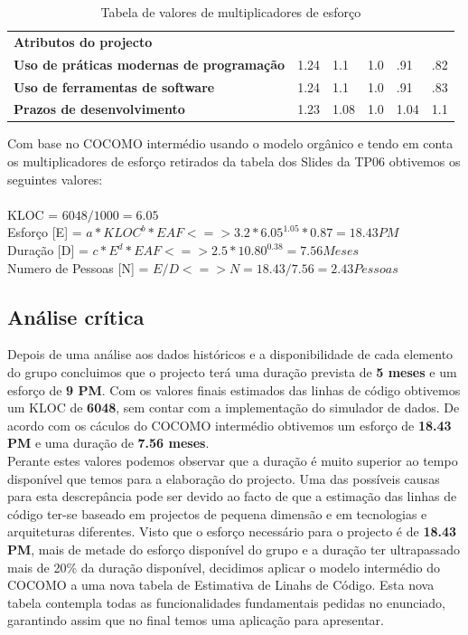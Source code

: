 \documentclass[a4paper]{report}
\begin{document}
\begin{table}[h]
\begin{adjustbox}{width=1\textwidth}
\begin{tabular}{|l|l|l|l|l|l|}
 &  &  &  &  &  \\ \hline
\textbf{Atributos do projecto} &  &  &  &  &  \\ \hline
\textbf{Uso de práticas modernas de programação} & 1.24 & 1.1 & \cellcolor[HTML]{FFFE65}1.0 & .91 & .82 \\ \hline
\textbf{Uso de ferramentas de software} & 1.24 & 1.1 & \cellcolor[HTML]{FFFE65}1.0 & .91 & .83 \\ \hline
\textbf{Prazos de desenvolvimento} & 1.23 & \cellcolor[HTML]{FFFE65}1.08 & 1.0 & 1.04 & 1.1 \\ \hline
\end{tabular}
\end{adjustbox}
\caption{Tabela de valores de multiplicadores de esforço}
\label{my-label}
\end{table}

Com base no COCOMO intermédio usando o modelo orgânico e tendo em conta os multiplicadores de esforço retirados da tabela dos Slides da TP06 \cite{slideTP6} obtivemos os seguintes valores:\\\\ 
KLOC = $6048 / 1000 = 6.05$ \\
Esforço [E] = $a * KLOC^{b} * EAF <=> 3.2 * 6.05^{1.05} * 0.87 = 18.43 PM$\\
Duração [D] = $c * E^{d} * EAF <=> 2.5 * 10.80^{0.38} = 7.56 Meses$\\
Numero de Pessoas [N] = $E / D <=> N = 18.43 / 7.56 = 2.43 Pessoas$

\pagebreak
\subsection{Análise crítica}
\label{AC}

Depois de uma análise aos dados históricos e a disponibilidade de cada elemento do grupo concluimos que o projecto terá uma duração prevista de \textbf{5 meses} e um esforço de \textbf{9 PM}. Com os valores finais estimados das linhas de código obtivemos um KLOC de \textbf{6048}, sem contar com a implementação do simulador de dados. De acordo com os cáculos do COCOMO intermédio obtivemos um esforço de \textbf{18.43 PM} e uma duração de \textbf{7.56 meses}.\\
Perante estes valores podemos observar que a duração é muito superior ao tempo disponível que temos para a elaboração do projecto. Uma das possíveis causas para esta descrepância pode ser devido ao facto de que a estimação das linhas de código ter-se baseado em projectos de pequena dimensão e em tecnologias e arquiteturas diferentes. Visto que o esforço necessário para o projecto é de \textbf{18.43 PM}, mais de metade do esforço disponível do grupo e a duração ter ultrapassado mais de 20\% da duração disponível, decidimos aplicar o modelo intermédio do COCOMO a uma nova tabela de Estimativa de Linahs de Código. Esta nova tabela contempla todas as funcionalidades fundamentais pedidas no enunciado, garantindo assim que no final temos uma aplicação para apresentar.
\end{document}
